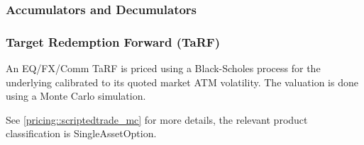 \subsubsection{Accumulators and Decumulators}
\subsubsection{Target Redemption Forward (TaRF)}
\label{pricing::tarf}

An EQ/FX/Comm TaRF is priced using a Black-Scholes process for the
underlying calibrated to its quoted market ATM volatility. The valuation is done using a Monte Carlo simulation.

See \ref{pricing::scriptedtrade_mc} for more details, the relevant product classification is SingleAssetOption.